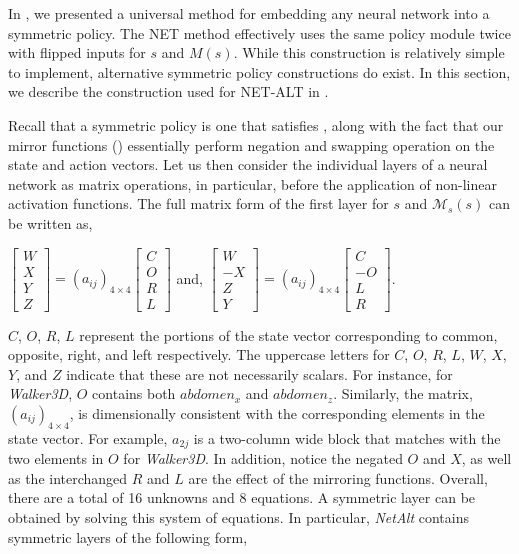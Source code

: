 In , we presented a universal method for embedding any neural network into a symmetric policy.  The NET method effectively uses the same policy module twice with flipped inputs for $s$ and $M(s)$.  While this construction is relatively simple to implement, alternative symmetric policy constructions do exist.  In this section, we describe the construction used for NET-ALT in .



Recall that a symmetric policy is one that satisfies , along with the fact that our mirror functions () essentially perform negation and swapping operation on the state and action vectors.  Let us then consider the individual layers of a neural network as matrix operations, in particular, before the application of non-linear activation functions.  The full matrix form of the first layer for $s$ and $\mathcal{M}_s(s)$ can be written as,

\begin{center}
$\begin{bmatrix} W \\ X \\ Y \\ Z  \end{bmatrix} = (a_{ij})_{4\times4} \begin{bmatrix} C \\ O \\ R \\ L \end{bmatrix}$ and, $\begin{bmatrix} W \\ -X \\ Z \\ Y  \end{bmatrix} = (a_{ij})_{4\times4} \begin{bmatrix} C \\  -O \\  L \\ R \end{bmatrix}$.
\end{center}

$C$, $O$, $R$, $L$ represent the portions of the state vector corresponding to common, opposite, right, and left respectively.  The uppercase letters for $C$, $O$, $R$, $L$, $W$, $X$, $Y$, and $Z$ indicate that these are not necessarily scalars. For instance, for \textit{Walker3D}, $O$ contains both $abdomen_x$ and $abdomen_z$.  Similarly, the matrix, $(a_{ij})_{4\times4}$, is dimensionally consistent with the corresponding elements in the state vector.  For example, $a_{2j}$ is a two-column wide block that matches with the two elements in $O$ for \textit{Walker3D}.  In addition, notice the negated $O$ and $X$, as well as the interchanged $R$ and $L$ are the effect of the mirroring functions.  Overall, there are a total of 16 unknowns and 8 equations.  A symmetric layer can be obtained by solving this system of equations.  In particular, \textit{NetAlt} contains symmetric layers of the following form,

